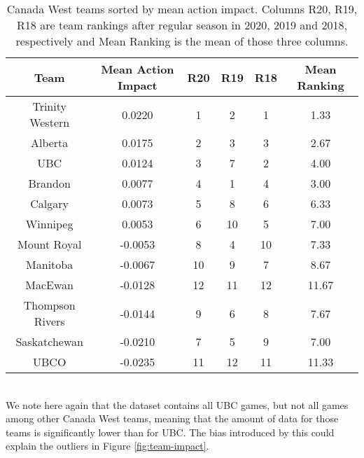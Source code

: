 \documentclass{sfuthesis}
\begin{document}
\begin{table}[h]
	\centering
	\begin{tabular}{cccccc}
		\textbf{Team}   & \textbf{Mean Action Impact} & \textbf{R20} & \textbf{R19} & \textbf{R18} & \textbf{Mean Ranking} \\ \hline
		Trinity Western & 0.0220                      & 1            & 2            & 1            & 1.33                  \\
		Alberta         & 0.0175                      & 2            & 3            & 3            & 2.67                  \\
		UBC             & 0.0124                      & 3            & 7            & 2            & 4.00                  \\
		Brandon         & 0.0077                      & 4            & 1            & 4            & 3.00                  \\
		Calgary         & 0.0073                      & 5            & 8            & 6            & 6.33                  \\
		Winnipeg        & 0.0053                      & 6            & 10           & 5            & 7.00                  \\
		Mount Royal     & -0.0053                     & 8            & 4            & 10           & 7.33                  \\
		Manitoba        & -0.0067                     & 10           & 9            & 7            & 8.67                  \\
		MacEwan         & -0.0128                     & 12           & 11           & 12           & 11.67                 \\
		Thompson Rivers & -0.0144                     & 9            & 6            & 8            & 7.67                  \\
		Saskatchewan    & -0.0210                     & 7            & 5            & 9            & 7.00                  \\
		UBCO            & -0.0235                     & 11           & 12           & 11           & 11.33                
	\end{tabular}
	\caption{Canada West teams sorted by mean action impact. Columns R20, R19, R18 are team rankings after regular season in 2020, 2019 and 2018, respectively and Mean Ranking is the mean of those three columns.}
	\label{tab:team-impact}
\end{table}\\
We note here again that the dataset contains all UBC games, but not all games among other Canada West teams, meaning that the amount of data for those teams is significantly lower than for UBC. The bias introduced by this could explain the outliers in Figure \ref{fig:team-impact}.\\\\
\end{document}
